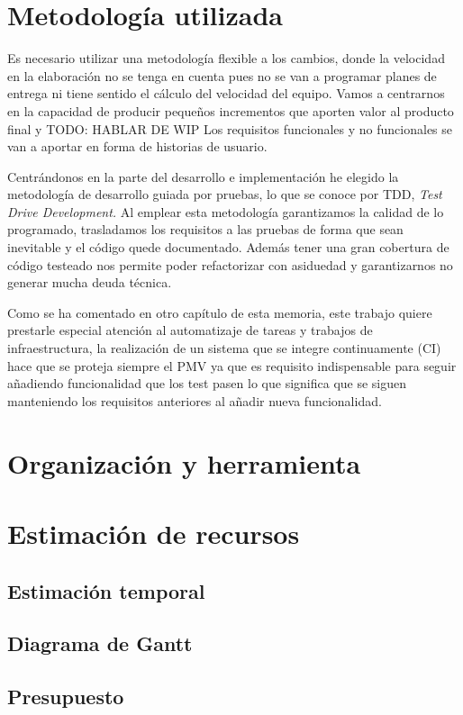 \section{Metodología utilizada}
Es necesario utilizar una metodología flexible a los cambios, donde la velocidad en la elaboración no se tenga en cuenta 
pues no se van a programar planes de entrega ni tiene sentido el cálculo del velocidad del equipo. Vamos  a centrarnos en la 
capacidad de producir pequeños incrementos que aporten valor al producto final y TODO: HABLAR DE WIP Los requisitos funcionales y no funcionales 
se van a aportar en forma de historias de usuario.

Centrándonos en la parte del desarrollo e implementación he elegido la metodología de desarrollo guiada por pruebas, 
lo que se conoce por TDD, \textit{Test Drive Development.} Al emplear esta metodología garantizamos la calidad de 
lo programado, trasladamos los requisitos a las pruebas de forma que sean inevitable y el código quede documentado. 
Además tener una gran cobertura de código testeado nos permite poder refactorizar con asiduedad y garantizarnos no generar
mucha deuda técnica.

Como se ha comentado en otro capítulo de esta memoria, este trabajo quiere prestarle especial atención al automatizaje 
de tareas y trabajos de infraestructura, la realización de un sistema que se integre continuamente (CI) hace que se 
proteja siempre el PMV ya que es requisito indispensable para seguir añadiendo funcionalidad que los test pasen lo que 
significa que se siguen manteniendo los requisitos anteriores al añadir nueva funcionalidad.

\section{Organización y herramienta}

\section{Estimación de recursos}

\subsection{Estimación temporal}

\subsection{Diagrama de Gantt}

\subsection{Presupuesto}
